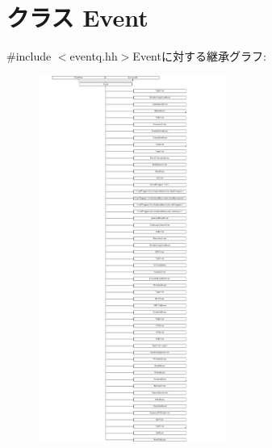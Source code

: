 \hypertarget{classEvent}{
\section{クラス Event}
\label{classEvent}
}


{\ttfamily \#include $<$eventq.hh$>$}Eventに対する継承グラフ:\begin{figure}[H]
\begin{center}
\leavevmode
\includegraphics[height=12cm]{classEvent}
\end{center}
\end{figure}
